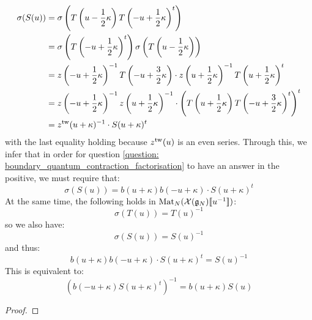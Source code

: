                 $$
                    \begin{aligned}
                        \sigma( S(u) ) & = \sigma\left( T\left(u - \frac12 \kappa\right) T\left(-u + \frac12 \kappa\right)^t \right)
                        \\
                        & = \sigma\left( T\left(-u + \frac12 \kappa\right)^t \right) \sigma\left( T\left(u - \frac12 \kappa\right) \right)
                        \\
                        & = z\left( -u + \frac12\kappa \right)^{-1} T\left( -u + \frac32\kappa \right) \cdot z\left( u + \frac12\kappa \right)^{-1} T\left( u + \frac12\kappa \right)^t
                        \\
                        & = z\left( -u + \frac12\kappa \right)^{-1} z\left( u + \frac12\kappa \right)^{-1} \cdot \left( T\left( u + \frac12\kappa \right) T\left( -u + \frac32\kappa \right)^t \right)^t
                        \\
                        & = z^{\mathrm{tw}}(u + \kappa)^{-1} \cdot S(u + \kappa)^t
                    \end{aligned}
                $$
            with the last equality holding because $z^{\mathrm{tw}}(u)$ is an even series. Through this, we infer that in order for question \ref{question: boundary_quantum_contraction_factorisation} to have an answer in the positive, we must require that:
                \begin{equation} \label{equation: applying_antipode_to_boundary_transfer_matrix}
                    \sigma( S(u) ) = b(u + \kappa)b(-u + \kappa) \cdot S(u + \kappa)^t
                \end{equation}
            At the same time, the following holds in $\mathrm{Mat}_N(\mathcal{X}(\mathfrak{g}_N)[\![u^{-1}]\!])$:
                $$\sigma(T(u)) = T(u)^{-1}$$
            so we also have:
                $$\sigma( S(u) ) = S(u)^{-1}$$
            and thus:
                $$b(u + \kappa)b(-u + \kappa) \cdot S(u + \kappa)^t = S(u)^{-1}$$
            This is equivalent to:
                $$( b(-u + \kappa) S(u + \kappa)^t )^{-1} = b(u + \kappa) S(u)$$

            \begin{proposition} \label{prop: mapping_IMO_reflection_algebras_to_extended_untwisted_yangians_via_extended_twisted_yangians}
                
            \end{proposition}
                \begin{proof}
                    
                \end{proof}

